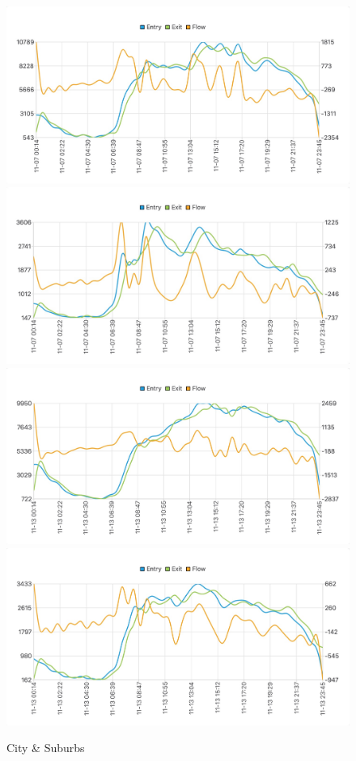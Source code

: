 \documentclass{article}
\begin{document}
\setlength{\parindent}{0em}
\begin{figure}[htbp] 
	\centering 
	\includegraphics[scale=0.14]{new_city_07_demand.jpg}
	\includegraphics[scale=0.14]{new_town_07_demand.jpg}
	\includegraphics[scale=0.14]{new_city_13_demand.jpg}
	\includegraphics[scale=0.14]{new_town_13_demand.jpg}
	\caption{City \& Suburbs}
\end{figure}
\setlength{\parindent}{2em}
\end{document}
